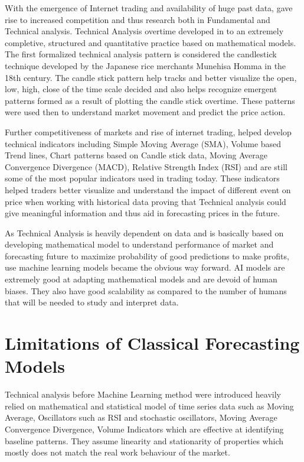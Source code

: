 With the emergence of Internet trading and availability of huge past data, gave rise to increased competition and thus research both in Fundamental and Technical analysis. Technical Analysis overtime developed in to an extremely completive, structured and quantitative practice based on mathematical models.
The first formalized technical analysis pattern is considered the candlestick technique developed by the Japanese rice merchants Munehisa Homma in the 18th century. The candle stick pattern help tracks and better visualize the open, low, high, close of the time scale decided and also helps recognize emergent patterns formed as a result of plotting the candle stick overtime. These patterns were used then to understand market movement and predict the price action.

Further competitiveness of markets and rise of internet trading, helped develop technical indicators including Simple Moving Average (SMA), Volume based Trend lines, Chart patterns based on Candle stick data, Moving Average Convergence Divergence (MACD), Relative Strength Index (RSI) and are still some of the most popular indicators used in trading today. These indicators helped traders better visualize and understand the impact of different event on price when working with historical data proving that Technical analysis could give meaningful information and thus aid in forecasting prices in the future.

As Technical Analysis is heavily dependent on data and is basically based on developing mathematical model to understand performance of market and forecasting future to maximize probability of good predictions to make profits, use machine learning models became the obvious way forward. AI models are extremely good at adapting mathematical models and are devoid of human biases. They also have good scalability as compared to the number of humans that will be needed to study and interpret data.


\section{Limitations of Classical Forecasting Models}

Technical analysis before Machine Learning method were introduced heavily relied on mathematical and statistical model of time series data such as Moving Average, Oscillators such as RSI and stochastic oscillators, Moving Average Convergence Divergence, Volume Indicators which are effective at identifying baseline patterns. They assume linearity and stationarity of properties which mostly does not match the real work behaviour of the market.

